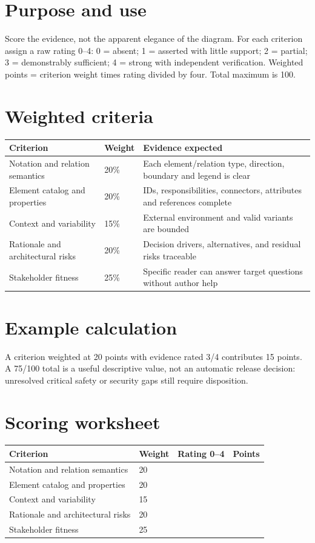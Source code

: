 \documentclass[10pt,letterpaper]{article}
\begin{document}
\DocProvenance
\section{Purpose and use}
Score the evidence, not the apparent elegance of the diagram. For each criterion assign a raw rating 0--4: 0 = absent; 1 = asserted with little support; 2 = partial; 3 = demonstrably sufficient; 4 = strong with independent verification. Weighted points = criterion weight times rating divided by four. Total maximum is 100.

\section{Weighted criteria}
\small
\begin{tabularx}{\linewidth}{@{}YYY@{}}
\toprule
\textbf{Criterion} & \textbf{Weight} & \textbf{Evidence expected} \\
\midrule
Notation and relation semantics & 20\% & Each element/relation type, direction, boundary and legend is clear \\
Element catalog and properties & 20\% & IDs, responsibilities, connectors, attributes and references complete \\
Context and variability & 15\% & External environment and valid variants are bounded \\
Rationale and architectural risks & 20\% & Decision drivers, alternatives, and residual risks traceable \\
Stakeholder fitness & 25\% & Specific reader can answer target questions without author help \\
\bottomrule
\end{tabularx}
\normalsize
\section{Example calculation}
A criterion weighted at 20 points with evidence rated 3/4 contributes 15 points. A 75/100 total is a useful descriptive value, not an automatic release decision: unresolved critical safety or security gaps still require disposition.

\section{Scoring worksheet}
\small
\begin{tabularx}{\linewidth}{@{}YYYY@{}}
\toprule
\textbf{Criterion} & \textbf{Weight} & \textbf{Rating 0--4} & \textbf{Points} \\
\midrule
Notation and relation semantics & 20 &  &  \\
Element catalog and properties & 20 &  &  \\
Context and variability & 15 &  &  \\
Rationale and architectural risks & 20 &  &  \\
Stakeholder fitness & 25 &  &  \\
\bottomrule
\end{tabularx}
\normalsize
\end{document}
